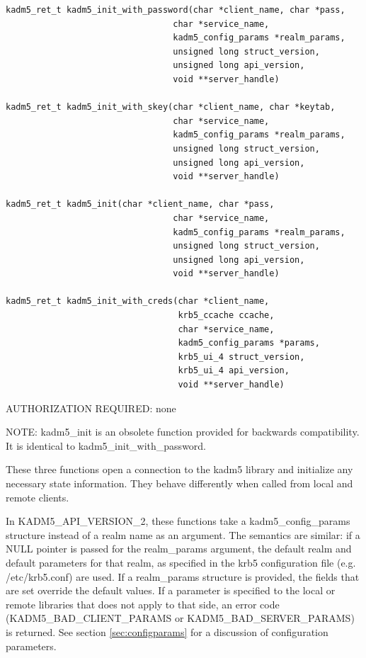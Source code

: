 \begin{verbatim}
kadm5_ret_t kadm5_init_with_password(char *client_name, char *pass,
                                 char *service_name,
                                 kadm5_config_params *realm_params,
                                 unsigned long struct_version,
                                 unsigned long api_version,
                                 void **server_handle)

kadm5_ret_t kadm5_init_with_skey(char *client_name, char *keytab,
                                 char *service_name,
                                 kadm5_config_params *realm_params,
                                 unsigned long struct_version,
                                 unsigned long api_version,
                                 void **server_handle)

kadm5_ret_t kadm5_init(char *client_name, char *pass,
                                 char *service_name,
                                 kadm5_config_params *realm_params,
                                 unsigned long struct_version,
                                 unsigned long api_version,
                                 void **server_handle)

kadm5_ret_t kadm5_init_with_creds(char *client_name,
                                  krb5_ccache ccache,
                                  char *service_name,
                                  kadm5_config_params *params,
                                  krb5_ui_4 struct_version,
                                  krb5_ui_4 api_version,
                                  void **server_handle)
\end{verbatim}

AUTHORIZATION REQUIRED: none

NOTE: kadm5_init is an obsolete function provided for backwards
compatibility.  It is identical to kadm5_init_with_password.

These three functions open a connection to the kadm5 library and
initialize any necessary state information.  They behave differently
when called from local and remote clients.

In KADM5_API_VERSION_2, these functions take a kadm5_config_params
structure instead of a realm name as an argument.  The semantics are
similar: if a NULL pointer is passed for the realm_params argument,
the default realm and default parameters for that realm, as specified
in the krb5 configuration file (e.g. /etc/krb5.conf) are used.  If a
realm_params structure is provided, the fields that are set override
the default values.  If a parameter is specified to the local or
remote libraries that does not apply to that side, an error code
(KADM5_BAD_CLIENT_PARAMS or KADM5_BAD_SERVER_PARAMS) is returned.  See
section \ref{sec:configparams} for a discussion of configuration
parameters.

